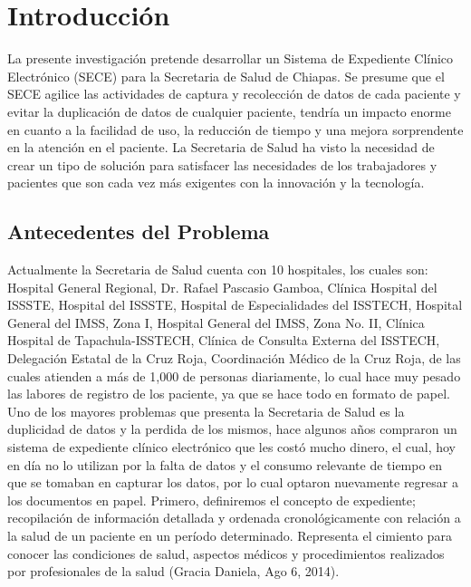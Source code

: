 \chapter{Introducción}
La presente investigación pretende desarrollar un Sistema de Expediente Clínico Electrónico (SECE) para la Secretaria de Salud de Chiapas. Se presume que el SECE agilice las actividades de captura y recolección de datos de cada paciente y evitar la duplicación de datos de cualquier paciente, tendría un impacto enorme en cuanto a la facilidad de uso, la reducción de tiempo y una mejora sorprendente en la atención en el paciente. La Secretaria de Salud ha visto la necesidad de crear un tipo de solución para satisfacer las necesidades de los trabajadores y pacientes que son cada vez más exigentes con la innovación y la tecnología.

\section{Antecedentes del Problema}
Actualmente la Secretaria de Salud  cuenta con 10 hospitales, los cuales son: Hospital General Regional, Dr. Rafael Pascasio Gamboa, Clínica Hospital del ISSSTE, Hospital del ISSSTE, Hospital de Especialidades del ISSTECH, Hospital General del IMSS, Zona I, Hospital General del IMSS, Zona No. II, Clínica Hospital de Tapachula-ISSTECH, Clínica de Consulta Externa del ISSTECH, Delegación Estatal de la Cruz Roja, Coordinación Médico de la Cruz Roja, de las cuales atienden a más de 1,000 de personas diariamente, lo cual hace muy pesado las labores de registro de los paciente, ya que se hace todo en formato de papel. Uno de los mayores problemas que presenta la Secretaria de Salud es la duplicidad de datos y la perdida de los mismos, hace algunos años compraron un sistema de expediente clínico electrónico que les costó mucho dinero, el cual, hoy en día no lo utilizan por la falta de datos y el consumo relevante de tiempo en que se tomaban en capturar los datos, por lo cual optaron nuevamente regresar a los documentos en papel.
Primero, definiremos el concepto de expediente; recopilación de información detallada y ordenada cronológicamente con relación a la salud de un paciente en un período determinado. Representa el cimiento para conocer las condiciones de salud, aspectos médicos y procedimientos realizados por profesionales de la salud (Gracia Daniela, Ago 6, 2014).
